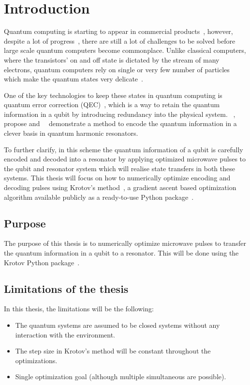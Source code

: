 \documentclass[main.tex]{subfiles}
\begin{document}
\chapter{Introduction}
Quantum computing is starting to appear in commercial products~\cite{santos_ibm_2016}, however, despite a lot of progress~\cite{preskill_quantum_2018}, there are still a lot of challenges to be solved before large scale quantum computers become commonplace.
Unlike classical computers, where the transistors' on and off state is dictated by the stream of many electrons, quantum computers rely on single or very few number of particles which make the quantum states very delicate~\cite{gottesman_introduction_2009}.

One of the key technologies to keep these states in quantum computing is quantum error correction (QEC)~\cite{gottesman_introduction_2009}, which is a way to retain the quantum information in a qubit by introducing redundancy into the physical system.
\citeauthor{leghtas_hardware-efficient_2013}~\cite{leghtas_hardware-efficient_2013},~\citeauthor{mirrahimi_dynamically_2014}~\cite{mirrahimi_dynamically_2014} propose and~\citeauthor{ofek_extending_2016}~\cite{ofek_extending_2016} demonstrate a method to encode the quantum information in a clever basis in quantum harmonic resonators.

To further clarify, in this scheme the quantum information of a qubit is carefully encoded and decoded into a resonator by applying optimized microwave pulses to the qubit and resonator system which will realise state transfers in both these systems. This thesis will focus on how to numerically optimize encoding and decoding pulses using Krotov's method~\cite{reich_monotonically_2012}, a gradient ascent based optimization algorithm available publicly as a ready-to-use Python package~\cite{goerz_krotov:_2019}.

\section{Purpose}
The purpose of this thesis is to numerically optimize microwave pulses to transfer the quantum information in a qubit to a resonator. This will be done using the Krotov Python package~\cite{goerz_krotov:_2019}.

\section{Limitations of the thesis}
In this thesis, the limitations will be the following:
\begin{itemize}
    \item The quantum systems are assumed to be closed systems without any interaction with the environment.
    \item The step size in Krotov's method will be constant throughout the optimizations.
    \item Single optimization goal (although multiple simultaneous are possible).
\end{itemize}
\end{document}
